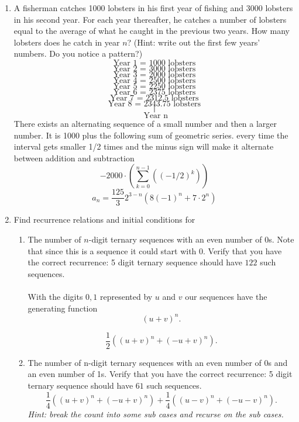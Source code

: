 \documentclass[12pt]{article}
\begin{document}
\begin{enumerate}
\item A fisherman catches 1000 lobsters in his first year of fishing and 3000 lobsters in his second year. For each year thereafter, he catches a number of lobsters equal to the average of what he caught in the previous two years. How many lobsters does he catch in year $n$? (Hint: write out the first few years' numbers. Do you notice a pattern?) \\
  \[\text{Year 1 = 1000 lobsters}\]
  \[\text{Year 2 = 3000 lobsters}\]
  \[\text{Year 3 = 2000 lobsters}\]
  \[\text{Year 4 = 2500 lobsters}\]
  \[\text{Year 5 = 2250 lobsters}\]
  \[\text{Year 6 = 2375 lobsters}\]
  \[\text{Year 7 = 2312.5 lobsters}\]
  \[\text{Year 8 = 2343.75 lobsters}\]
  \[\text{.}\]
  \[\text{.}\]
  \[\text{.}\]
  \[\text{.}\]
  \[\text{.}\]
  \[\text{ Year n}\]
  There exists an alternating sequence of a small number and then a larger number.
It is 1000 plus the following sum of geometric series. every time the interval gets smaller 1/2 times and the minus sign will make it alternate between addition and subtraction
\[ -2000\cdot(\sum_{k=0}^{n-1}((-1/2)^{k})) \]
  \[ a_n = \dfrac{125}{3}2^{3-n}(8(-1)^{n}+7 \cdot 2^{n})\]

\item Find recurrence relations and initial conditions for
\begin{enumerate} 
\item The number of $n$-digit ternary sequences with an even number of $0$s. Note that since this is a sequence it could start with $0$. Verify that you have the correct recurrence: 5 digit ternary sequence should have $122$ such sequences.\\\\
With the digits $0,1$ represented by $u$ and $v$ our sequences have the generating function
$$(u+v)^n.$$

$$\frac{1}{2} \left((u+v)^n + (-u+v)^n\right).$$

\item The number of n-digit ternary sequences with an even number of 0s and an even number of 1s. Verify that you have the correct recurrence: 5 digit ternary sequence should have $61$ such sequences. \\
$$\frac{1}{4} \left((u+v)^n + (-u+v)^n\right)
+ \frac{1}{4} \left((u-v)^n + (-u-v)^n\right).$$
{\it Hint: break the count into some sub cases and recurse on the sub cases.}
\end{enumerate}

\end{enumerate}
\end{document}
